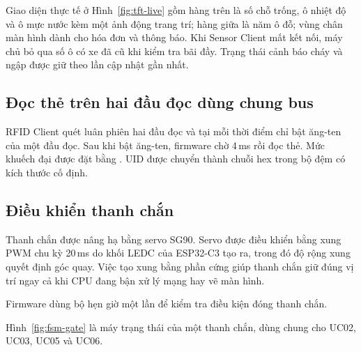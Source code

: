 Giao diện thực tế ở
Hình~\ref{fig:tft-live} gồm hàng trên là số chỗ trống, ô nhiệt độ và ô mực nước kèm một ảnh
động trang trí; hàng giữa là năm ô đỗ; vùng chân màn hình dành cho hóa đơn và thông báo. Khi
Sensor Client mất kết nối, máy chủ bỏ qua số ô có xe đã cũ khi kiểm tra bãi đầy. Trạng thái cảnh báo cháy và ngập được giữ theo lần cập nhật gần nhất.

\subsection{Đọc thẻ trên hai đầu đọc dùng chung bus}\label{sec:f-reader}
RFID Client quét luân phiên hai đầu đọc và tại mỗi thời điểm chỉ bật ăng-ten của một đầu đọc.
Sau khi bật ăng-ten, firmware chờ 4\,ms rồi đọc thẻ. Mức khuếch đại được đặt bằng . UID được chuyển thành chuỗi hex trong bộ đệm có kích thước cố định.

\subsection{Điều khiển thanh chắn}\label{sec:f-gate}
Thanh chắn được nâng hạ bằng servo SG90. Servo được điều khiển bằng xung PWM chu kỳ 20\,ms
do khối LEDC của ESP32-C3 tạo ra, trong đó độ rộng xung quyết định góc quay. Việc tạo xung bằng
phần cứng giúp thanh chắn giữ đúng vị trí ngay cả khi CPU đang bận xử lý mạng hay vẽ màn hình.

Firmware dùng bộ hẹn giờ một lần  để kiểm tra điều kiện đóng thanh chắn.

Hình~\ref{fig:fsm-gate} là máy trạng thái của một thanh chắn, dùng chung cho UC02, UC03, UC05 và
UC06.

